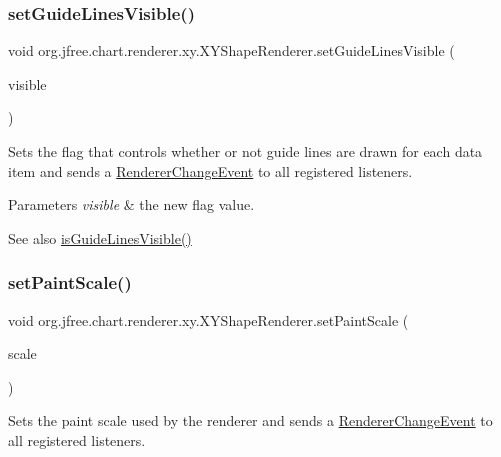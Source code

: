 \subsubsection{\texorpdfstring{set\+Guide\+Lines\+Visible()}{setGuideLinesVisible()}}
{\footnotesize\ttfamily void org.\+jfree.\+chart.\+renderer.\+xy.\+X\+Y\+Shape\+Renderer.\+set\+Guide\+Lines\+Visible (\begin{DoxyParamCaption}\item[{boolean}]{visible }\end{DoxyParamCaption})}

Sets the flag that controls whether or not guide lines are drawn for each data item and sends a \mbox{\hyperlink{}{Renderer\+Change\+Event}} to all registered listeners.


\begin{DoxyParams}{Parameters}
{\em visible} & the new flag value.\\
\hline
\end{DoxyParams}
\begin{DoxySeeAlso}{See also}
\mbox{\hyperlink{classorg_1_1jfree_1_1chart_1_1renderer_1_1xy_1_1_x_y_shape_renderer_a34e6023b51701e33b663b29b910c22d7}{is\+Guide\+Lines\+Visible()}} 
\end{DoxySeeAlso}
\mbox{\label{classorg_1_1jfree_1_1chart_1_1renderer_1_1xy_1_1_x_y_shape_renderer_af7e7956fd96ef26631f654507b95c5d9}} 
\subsubsection{\texorpdfstring{set\+Paint\+Scale()}{setPaintScale()}}
{\footnotesize\ttfamily void org.\+jfree.\+chart.\+renderer.\+xy.\+X\+Y\+Shape\+Renderer.\+set\+Paint\+Scale (\begin{DoxyParamCaption}\item[{\mbox{\hyperlink{interfaceorg_1_1jfree_1_1chart_1_1renderer_1_1_paint_scale}{Paint\+Scale}}}]{scale }\end{DoxyParamCaption})}

Sets the paint scale used by the renderer and sends a \mbox{\hyperlink{}{Renderer\+Change\+Event}} to all registered listeners.


